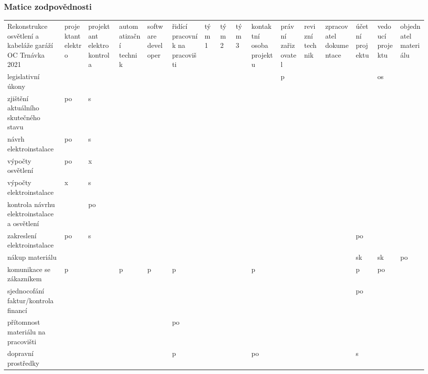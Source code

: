 \documentclass[a4paper, twoside, 11pt]{article}
\begin{document}
	\subsubsection{Matice zodpovědnosti}
		\begin{table}[H]
		\resizebox{1 \textwidth}{!}
		{
		
			\begin{tabular}{ !{\vrule width 2pt} p{3cm} !{\vrule width 2pt} p{1.5cm} | p{2cm} | p{2cm} | p{2cm} | p{2cm} | p{0.75cm} | p{0.75cm} | p{0.75cm} | p{2cm} | p{2cm} | p{2cm} | p{2cm} | p{2cm} | p{2cm} | p{2cm} !{\vrule width 2pt} }
				Rekonstrukce osvětlení a kabeláže garáží OC Trnávka 2021 & projektant elektro & projektant elektro kontrola & automatizační technik & software developer & řidící pracovník na pracovišti & tým 1 & tým 2 & tým 3 & kontaktní osoba projektu & právní zařizovatel & revizní technik & zpracovatel dokumentace & účetní projektu & vedoucí projektu & objednatel materiálu \\ 
	legislativní úkony &  &  &  &  &  &  &  &  &  & p &  &  &  & os &  \\ \hline
	zjištění aktuálního skutečného stavu & po & s~&  &  &  &  &  &  &  &  &  &  &  &  &  \\ \hline
	návrh elektroinstalace & po & s~&  &  &  &  &  &  &  &  &  &  &  &  &  \\ \hline
	výpočty osvětlení & po & x &  &  &  &  &  &  &  &  &  &  &  &  &  \\ \hline
	výpočty elektroinstalace & x & s~&  &  &  &  &  &  &  &  &  &  &  &  &  \\ \hline
	kontrola návrhu elektroinstalace a osvětlení &  & po &  &  &  &  &  &  &  &  &  &  &  &  &  \\ \hline
	zakreslení elektroinstalace & po & s~&  &  &  &  &  &  &  &  &  &  & po &  &  \\ \hline
	nákup materiálu &  &  &  &  &  &  &  &  &  &  &  &  & sk & sk & po \\ \hline
	komunikace se zákazníkem & p &  & p & p & p &  &  &  & p &  &  &  & p &  po &  \\ \hline
	sjednocofání faktur/kontrola financí &  &  &  &  &  &  &  &  &  &  &  &  & po &  &  \\ \hline
	přítomnost materiálu na pracovišti &  &  &  &  & po &  &  &  &  &  &  &  &  &  &  \\ \hline
	dopravní prostředky &  &  &  &  & p &  &  &  & po &  &  &  & s~&  &  \\ \hline

\end{tabular}}
\end{table}
\end{document}
